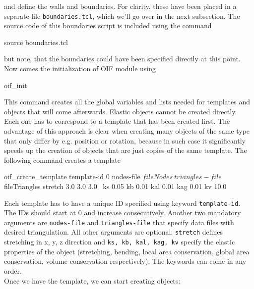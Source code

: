 \documentclass[
a4paper,                        %
11pt,                           %
twoside,                        %
footsepline,                    %
headsepline,                    %
headexclude,                    %
footexclude,                    %
pagesize,                       %
]{scrartcl}
\begin{document}
and define the walls and boundaries. For clarity, these have been placed in a separate file \verb|boundaries.tcl|, which we'll go over in the next subsection. The source code of this boundaries script is included using the command\\
\begin{tclcode}
  source boundaries.tcl
\end{tclcode}
\vspace{0 mm}

but note, that the boundaries could have been specified directly at this point.\\

Now comes the initialization of OIF module using\\ 
\begin{tclcode}
  oif_init
\end{tclcode}
\vspace{0 mm}

This command creates all the global variables and lists needed for templates and objects that will come afterwards. Elastic objects cannot be created directly. Each one has to correspond to a template that has been created first. The advantage of this approach is clear when creating many objects of the same type that only differ by e.g. position or rotation, because in such case it significantly speeds up the creation of objects that are just copies of the same template. The following command creates a template\\
\begin{tclcode}
  oif_create_template template-id 0 nodes-file $fileNodes \ 
  triangles-file $fileTriangles stretch 3.0 3.0 3.0 \
  ks 0.05 kb 0.01 kal 0.01 kag 0.01 kv 10.0
\end{tclcode}
\vspace{0 mm}

Each template has to have a unique ID specified using keyword \verb|template-id|. The IDs should start at 0 and increase consecutively. Another two mandatory arguments are \verb|nodes-file| and \verb|triangles-file| that specify data files with desired triangulation. All other arguments are optional: \verb|stretch| defines stretching in x, y, z direction and \verb|ks, kb, kal, kag, kv| specify the elastic properties of the object (stretching, bending, local area conservation, global area conservation, volume conservation respectively). The keywords can come in any order.\\

Once we have the template, we can start creating objects:\\
\vspace{0 mm}
\end{document}
